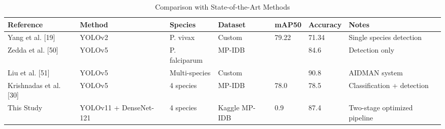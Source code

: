 \begin{table}[h]
\centering
\caption{Comparison with State-of-the-Art Methods}
\label{tab:prior_works_comparison}
\begin{tabular}{lllllll}
\toprule
Reference & Method & Species & Dataset & mAP50 & Accuracy & Notes \\
\midrule
Yang et al. [19] & YOLOv2 & P. vivax & Custom & 79.22 & 71.34 & Single species detection \\
Zedda et al. [50] & YOLOv5 & P. falciparum & MP-IDB &  & 84.6 & Detection only \\
Liu et al. [51] & YOLOv5 & Multi-species & Custom &  & 90.8 & AIDMAN system \\
Krishnadas et al. [30] & YOLOv5 & 4 species & MP-IDB & 78.0 & 78.5 & Classification + detection \\
This Study & YOLOv11 + DenseNet-121 & 4 species & Kaggle MP-IDB & 0.9 & 87.4 & Two-stage optimized pipeline \\
\bottomrule
\end{tabular}

\end{table}
